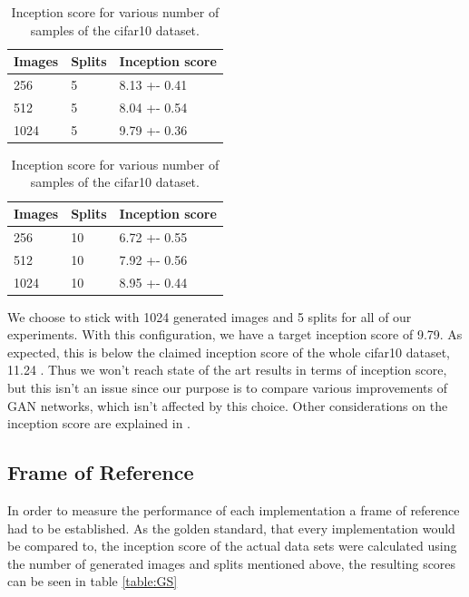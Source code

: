 \begin{table}[H]
\centering
\setlength{\tabcolsep}{0.5em} %

\begin{subtable}{.5\textwidth}
\centering

\begin{tabular}{l l l}
\toprule
Images & Splits & Inception score  \\ 
\midrule
      256  & 5 & 8.13 +- 0.41 \\   
      512  & 5 & 8.04 +- 0.54 \\ 
      1024 & 5 & 9.79 +- 0.36 \\
\bottomrule
\end{tabular}

\end{subtable}%
\begin{subtable}{.5\textwidth}
\centering

\begin{tabular}{l l l}
\toprule
Images & Splits & Inception score  \\ 
\midrule
      256  & 10 & 6.72 +- 0.55 \\   
      512  & 10 & 7.92 +- 0.56\\ 
      1024 & 10 & 8.95 +- 0.44 \\
\bottomrule
\end{tabular}
\end{subtable}%
%
\vspace{0.3cm}
\caption{Inception score for various number of samples of the cifar10 dataset.}
\label{table:exp-isc}
\end{table}%
We choose to stick with 1024 generated images and 5 splits for all of our experiments. With this configuration, we have a target inception score of 9.79. As expected, this is below the claimed inception score of the whole cifar10 dataset, 11.24 \cite{salimans2016improved}. Thus we won't reach state of the art results in terms of inception score, but this isn't an issue since our purpose is to compare various improvements of GAN networks, which isn't affected by this choice. Other considerations on the inception score are explained in \cite{barratt2018note}.

\subsection{Frame of Reference}
In order to measure the performance of each implementation a frame of reference had to be established. As the golden standard, that every implementation would be compared to, the inception score of the actual data sets were calculated using the number of generated images and splits mentioned above, the resulting scores can be seen in table \ref{table:GS}

